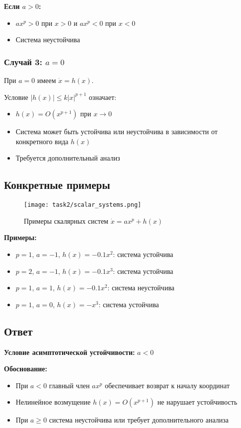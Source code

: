 \textbf{Если $a > 0$:}
\begin{itemize}
\item $ax^p > 0$ при $x > 0$ и $ax^p < 0$ при $x < 0$
\item Система неустойчива
\end{itemize}

\subsubsection*{Случай 3: $a = 0$}

При $a = 0$ имеем $\dot{x} = h(x)$.

Условие $|h(x)| \leq k|x|^{p+1}$ означает:
\begin{itemize}
\item $h(x) = O(x^{p+1})$ при $x \to 0$
\item Система может быть устойчива или неустойчива в зависимости от конкретного вида $h(x)$
\item Требуется дополнительный анализ
\end{itemize}

\subsection*{Конкретные примеры}

\begin{figure}[H]
\centering
\texttt{[image: task2/scalar\_systems.png]}
\caption{Примеры скалярных систем $\dot{x} = ax^p + h(x)$}
\label{fig:scalar_systems}
\end{figure}

\textbf{Примеры:}
\begin{itemize}
\item $p = 1$, $a = -1$, $h(x) = -0.1x^2$: система устойчива
\item $p = 2$, $a = -1$, $h(x) = -0.1x^3$: система устойчива  
\item $p = 1$, $a = 1$, $h(x) = -0.1x^2$: система неустойчива
\item $p = 1$, $a = 0$, $h(x) = -x^3$: система устойчива
\end{itemize}

\subsection*{Ответ}

\textbf{Условие асимптотической устойчивости:} $a < 0$

\textbf{Обоснование:}
\begin{itemize}
\item При $a < 0$ главный член $ax^p$ обеспечивает возврат к началу координат
\item Нелинейное возмущение $h(x) = O(x^{p+1})$ не нарушает устойчивость
\item При $a \geq 0$ система неустойчива или требует дополнительного анализа
\end{itemize}

